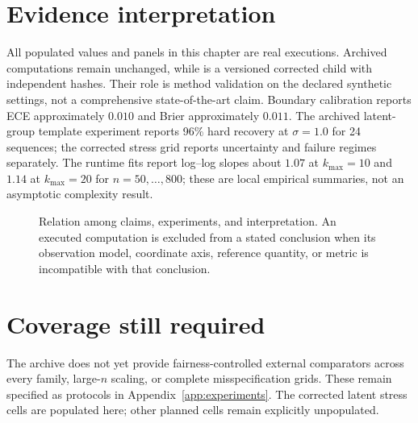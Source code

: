 \section{Evidence interpretation}
All populated values and panels in this chapter are real executions. Archived computations remain
unchanged, while  is a versioned corrected child with independent hashes.
Their role is method validation on the declared synthetic settings, not a comprehensive
state-of-the-art claim.
Boundary calibration reports ECE approximately $0.010$ and Brier approximately $0.011$. The
archived latent-group template experiment reports 96\% hard recovery at $\sigma=1.0$ for 24
sequences; the corrected stress grid reports uncertainty and failure regimes separately.
The runtime fits report log--log slopes about $1.07$ at $k_{\max}=10$ and $1.14$ at
$k_{\max}=20$ for $n=50,\ldots,800$; these are local empirical summaries, not an asymptotic
complexity result.

\begin{figure}[H]
\centering
\resizebox{0.96\textwidth}{!}{}
\caption{Relation among claims, experiments, and interpretation. An executed computation is excluded from a stated conclusion when its observation model, coordinate axis, reference quantity, or metric is incompatible with that conclusion.}
\label{fig:claim-experiment-map}
\end{figure}

\section{Coverage still required}
The archive does not yet provide fairness-controlled external comparators across every family,
large-$n$ scaling, or complete misspecification grids. These remain specified as protocols in
Appendix~\ref{app:experiments}. The corrected latent stress cells are populated here; other planned
cells remain explicitly unpopulated.
